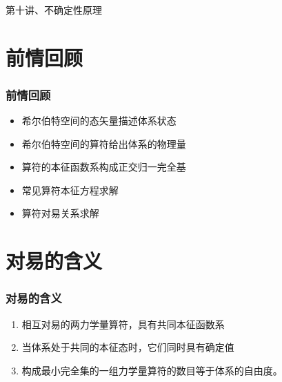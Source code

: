 \begin{frame}
    \frametitle{}
    \begin{center}
    { {\huge 第十讲、不确定性原理}}
    \end{center}    
\end{frame}


\section{前情回顾}

\begin{frame}
    \frametitle{前情回顾}
    \begin{itemize}
        \item 希尔伯特空间的态矢量描述体系状态
        \item 希尔伯特空间的算符给出体系的物理量
        \item 算符的本征函数系构成正交归一完全基
        \item 常见算符本征方程求解
        \item 算符对易关系求解
    \end{itemize}   
\end{frame} 

\section{对易的含义}
\begin{frame} 
    \frametitle{对易的含义}
    \begin{enumerate}
        \item  相互对易的两力学量算符，具有共同本征函数系
        \item  当体系处于共同的本征态时，它们同时具有确定值
        \item  构成最小完全集的一组力学量算符的数目等于体系的自由度。
    \end{enumerate}
\end{frame} 

